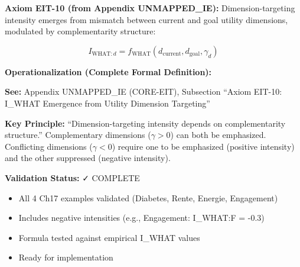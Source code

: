 \begin{tcolorbox}[colback=green!5!white, colframe=green!75!black,
    title=\textbf{EIT-10: I_WHAT Emergence (FORMALIZED)}]

\textbf{Axiom EIT-10 (from Appendix UNMAPPED_IE):} Dimension-targeting intensity emerges from mismatch between current and goal utility dimensions, modulated by complementarity structure:

\begin{equation}
I_{\text{WHAT}:d} = f_{\text{WHAT}}(d_{\text{current}}, d_{\text{goal}}, \gamma_d)
\end{equation}

\textbf{Operationalization (Complete Formal Definition):}

\textbf{See:} Appendix UNMAPPED_IE (CORE-EIT), Subsection ``Axiom EIT-10: I_WHAT Emergence from Utility Dimension Targeting''

\textbf{Key Principle:} ``Dimension-targeting intensity depends on complementarity structure.'' Complementary dimensions ($\gamma > 0$) can both be emphasized. Conflicting dimensions ($\gamma < 0$) require one to be emphasized (positive intensity) and the other suppressed (negative intensity).

\textbf{Validation Status:} ✓ COMPLETE
\begin{itemize}[nosep]
\item All 4 Ch17 examples validated (Diabetes, Rente, Energie, Engagement)
\item Includes negative intensities (e.g., Engagement: I_WHAT:F = -0.3)
\item Formula tested against empirical I_WHAT values
\item Ready for implementation
\end{itemize}

\end{tcolorbox}

